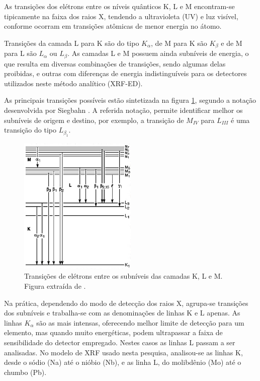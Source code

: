 As transições dos elétrons entre os níveis quânticos K, L e M encontram-se 
tipicamente na faixa dos raios X, tendendo a ultravioleta (UV) e luz visível,
conforme ocorram em transições atômicas de menor energia no átomo.

Transições da camada L para K são do tipo $K_{\alpha}$, de M para K 
são $K_{\beta}$ e de M para L são $L_{\alpha}$ ou $L_{\beta}$. 
As camadas L e M possuem ainda subníveis de energia, o que resulta em diversas
combinações de transições, sendo algumas delas proibidas, e outras 
com diferenças de energia indistinguíveis para os detectores utilizados 
neste método analítico (XRF-ED).

As principais transições possíveis estão sintetizada na figura \ref{fig:siegbahn}, 
segundo a notação desenvolvida por Siegbahn \citep{jenkins1991}. A referida 
notação, permite identificar melhor os subníveis de origem e destino, por exemplo, 
a transição de $M_{IV}$ para $L_{III}$ é uma transição do tipo $L_{\beta_1}$. 

\begin{figure}[H]
  \centering 
  \includegraphics[width=0.5\textwidth]{../inputs/images/Siegbahn.jpg}
  \caption{Transições de elétrons entre os subníveis das camadas K, L e M. 
           Figura extraída de \citet{jenkins1991}. \label{fig:siegbahn}}
\end{figure}

Na prática, dependendo do modo de detecção dos raios X, agrupa-se transições 
dos subníveis e trabalha-se com as denominações de linhas K e L apenas. As linhas
$K_{\alpha}$ são as mais intensas, oferecendo melhor limite de detecção
para um elemento, mas quando muito energéticas, podem ultrapassar a
faixa de sensibilidade do detector empregado. Nestes casos as linhas L passam a 
ser analisadas. No modelo de XRF usado nesta pesquisa, analisou-se as linhas K, 
desde o sódio (Na) até o nióbio (Nb), e as linha L, do molibdênio (Mo) até o chumbo (Pb).  
 

